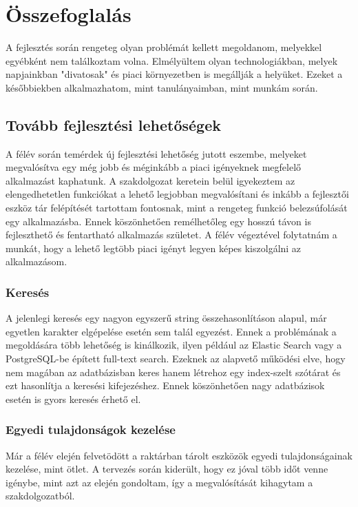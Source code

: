 \chapter{Összefoglalás}

A fejlesztés során rengeteg olyan problémát kellett megoldanom, melyekkel egyébként nem találkoztam volna.
Elmélyültem olyan technologiákban, melyek napjainkban "divatosak" és piaci környezetben is megállják a helyüket.
Ezeket a későbbiekben alkalmazhatom, mint tanulányaimban, mint munkám során.

\section{Tovább fejlesztési lehetőségek}
A félév során temérdek új fejlesztési lehetőség jutott eszembe, melyeket megvalósítva egy még jobb és méginkább a piaci igényeknek megfelelő alkalmazást kaphatunk.
A szakdolgozat keretein belül igyekeztem az elengedhetetlen funkciókat a lehető legjobban megvalósítani és inkább a fejlesztői eszköz tár felépítését tartottam fontosnak, mint a rengeteg funkció belezsúfolását egy alkalmazásba.
Ennek köszönhetően remélhetőleg egy hosszú távon is fejleszthető és fentartható alkalmazás születet.
A félév végeztével folytatnám a munkát, hogy a lehető legtöbb piaci igényt legyen képes kiszolgálni az alkalmazásom.

\subsection{Keresés}
A jelenlegi keresés egy nagyon egyszerű string összehasonlításon alapul, már egyetlen karakter elgépelése esetén sem talál egyezést.
Ennek a problémának a megoldására több lehetőség is kinálkozik, ilyen például az Elastic Search vagy a PostgreSQL-be épített full-text search.
Ezeknek az alapvető működési elve, hogy nem magában az adatbázisban keres hanem létrehoz egy index-szelt szótárat és ezt hasonlítja a keresési kifejezéshez.
Ennek köszönhetően nagy adatbázisok esetén is gyors keresés érhető el.

\subsection{Egyedi tulajdonságok kezelése}
Már a félév elején felvetödött a raktárban tárolt eszközök egyedi tulajdonságainak kezelése, mint ötlet.
A tervezés során kiderült, hogy ez jóval több időt venne igénybe, mint azt az elején gondoltam, így a megvalósítását kihagytam a szakdolgozatból.

